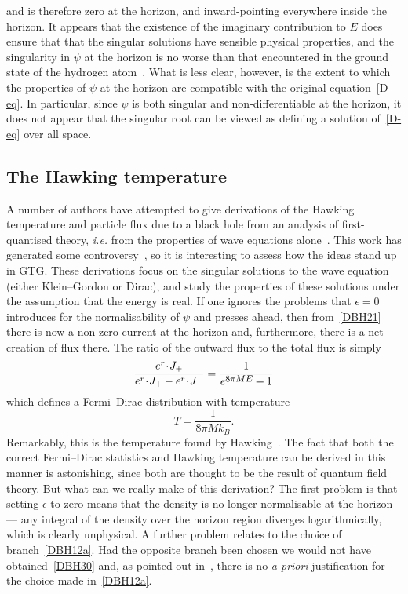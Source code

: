 \documentclass[a4paper]{article}
\numberwithin{equation}{section}
\newcommand{\et}[1]{e^{\mbox{\footnotesize $#1$}}}
\newcommand{\dt}{\! \cdot \!}
\newcommand{\eps}{\epsilon}
\begin{document}
%
and is therefore zero at the horizon, and inward-pointing everywhere
inside the horizon.  It appears that the existence of the imaginary
contribution to $E$ does ensure that that the singular solutions have
sensible physical properties, and the singularity in $\psi$ at the
horizon is no worse than that encountered in the ground state of the
hydrogen atom~\cite{bjo-rel1}.  What is less clear, however, is the
extent to which the properties of $\psi$ at the horizon are compatible
with the original equation~\eqref{D-eq}.  In particular, since $\psi$ is
both singular and non-differentiable at the horizon, it does not
appear that the singular root can be viewed as defining a solution
of~\eqref{D-eq} over all space.


\subsection{The Hawking temperature}

A number of authors have attempted to give derivations of the Hawking
temperature and particle flux due to a black hole from an analysis of
first-quantised theory, \textit{i.e.\/} from the properties of wave
equations alone~\cite{dam76,liu81,zha82}.  This work has generated
some controversy~\cite{mart77}, so it is interesting to assess how the
ideas stand up in GTG.  These derivations focus on the singular
solutions to the wave equation (either Klein--Gordon or Dirac), and
study the properties of these solutions under the assumption that the
energy is real.  If one ignores the problems that $\eps=0$ introduces
for the normalisability of $\psi$ and presses ahead, then
from~\eqref{DBH21} there is now a non-zero current at the horizon and,
furthermore, there is a net creation of flux there.  The ratio of the
outward flux to the total flux is simply
%
\begin{equation}
\frac{e^r\dt J_+}{e^r\dt J_+ - e^r\dt J_-} = \frac{1}{\et{8\pi ME} +1} 
\label{DBH30}
\end{equation}
%
which defines a Fermi--Dirac distribution with temperature
%
\begin{equation}
T = \frac{1}{8\pi M k_B}.
\end{equation}
%
Remarkably, this is the temperature found by Hawking~\cite{haw74}.
The fact that both the correct Fermi--Dirac statistics and Hawking
temperature can be derived in this manner is astonishing, since both
are thought to be the result of quantum field theory.  But what can we
really make of this derivation?  The first problem is that setting
$\eps$ to zero means that the density is no longer normalisable at the
horizon --- any integral of the density over the horizon region
diverges logarithmically, which is clearly unphysical.  A further
problem relates to the choice of branch~\eqref{DBH12a}.  Had the opposite
branch been chosen we would not have obtained~\eqref{DBH30} and, as
pointed out in~\cite{mart77}, there is no \textit{a priori\/}
justification for the choice made in~\eqref{DBH12a}.
\end{document}
